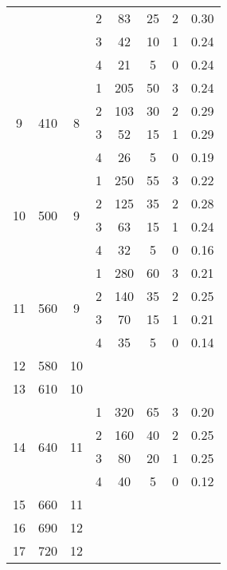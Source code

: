 \begin{longtable}[c]{|c|c|c|c|c|c|c|c|}
    & & & 2 & 83 & 25 & 2 & 0.30 \\\cline{4-8}
    & & & 3 & 42 & 10 & 1 & 0.24 \\\cline{4-8}
    & & & 4 & 21 & 5 & 0 & 0.24 \\\hline
    \multirow{4}{*}{9} & \multirow{4}{*}{410} & \multirow{4}{*}{8} & 1 & 205 & 50 & 3 & 0.24 \\\cline{4-8}
    & & & 2 & 103 & 30 & 2 & 0.29 \\\cline{4-8}
    & & & 3 & 52 & 15 & 1 & 0.29 \\\cline{4-8}
    & & & 4 & 26 & 5 & 0 & 0.19 \\\hline
    \multirow{4}{*}{10} & \multirow{4}{*}{500} & \multirow{4}{*}{9} & 1 & 250 & 55 & 3 & 0.22 \\\cline{4-8}
    & & & 2 & 125 & 35 & 2 & 0.28 \\\cline{4-8}
    & & & 3 & 63 & 15 & 1 & 0.24 \\\cline{4-8}
    & & & 4 & 32 & 5 & 0 & 0.16 \\\hline
    \multirow{4}{*}{11} & \multirow{4}{*}{560} & \multirow{4}{*}{9} & 1 & 280 & 60 & 3 & 0.21 \\\cline{4-8}
    & & & 2 & 140 & 35 & 2 & 0.25 \\\cline{4-8}
    & & & 3 & 70 & 15 & 1 & 0.21 \\\cline{4-8}
    & & & 4 & 35 & 5 & 0 & 0.14 \\\hline
    \multirow{1}{*}{12} & \multirow{1}{*}{580} & \multirow{1}{*}{10} & & & & & \\\hline
    \multirow{1}{*}{13} & \multirow{1}{*}{610} & \multirow{1}{*}{10} & & & & & \\\hline
    \multirow{4}{*}{14} & \multirow{4}{*}{640} & \multirow{4}{*}{11} & 1 & 320 & 65 & 3 & 0.20 \\\cline{4-8}
    & & & 2 & 160 & 40 & 2 & 0.25 \\\cline{4-8}
    & & & 3 & 80 & 20 & 1 & 0.25 \\\cline{4-8}
    & & & 4 & 40 & 5 & 0 & 0.12 \\\hline
    \multirow{1}{*}{15} & \multirow{1}{*}{660} & \multirow{1}{*}{11} & & & & & \\\hline
    \multirow{1}{*}{16} & \multirow{1}{*}{690} & \multirow{1}{*}{12} & & & & & \\\hline
    \multirow{1}{*}{17} & \multirow{1}{*}{720} & \multirow{1}{*}{12} & & & & & \\\hline
\end{longtable}


